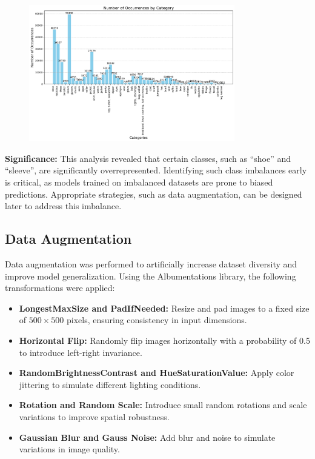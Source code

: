 \begin{figure}[H]
\centering
    \includegraphics[width=0.8\textwidth]{images/classes.png}
\end{figure}

\textbf{Significance:} This analysis revealed that certain classes, such as ``shoe'' and ``sleeve'', are significantly overrepresented. Identifying such class imbalances early is critical, as models trained on imbalanced datasets are prone to biased predictions. Appropriate strategies, such as data augmentation, can be designed later to address this imbalance.

\subsection{Data Augmentation}

Data augmentation was performed to artificially increase dataset diversity and improve model generalization. Using the Albumentations library, the following transformations were applied:

\vspace{-1.25em}
\begin{itemize}
    \setlength\itemsep{-1.05em}
    \item \textbf{LongestMaxSize and PadIfNeeded:} Resize and pad images to a fixed size of $500 \times 500$ pixels, ensuring consistency in input dimensions.
    \item \textbf{Horizontal Flip:} Randomly flip images horizontally with a probability of 0.5 to introduce left-right invariance.
    \item \textbf{RandomBrightnessContrast and HueSaturationValue:} Apply color jittering to simulate different lighting conditions.
    \item \textbf{Rotation and Random Scale:} Introduce small random rotations and scale variations to improve spatial robustness.
    \item \textbf{Gaussian Blur and Gauss Noise:} Add blur and noise to simulate variations in image quality.
\end{itemize}

